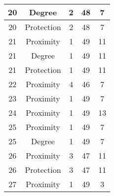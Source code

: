 \documentclass[results.tex]{subfiles}
\begin{document}
\begin{center}
\begin{tabular}{| c || c | c | c | c |}
            \hline
            20                      & Degree                       & 2                      & 48                      & 7                    \\
            \hline
            20                      & Protection                   & 2                      & 48                      & 7                    \\
            \hline
            21                      & Proximity                    & 1                      & 49                      & 11                   \\
            \hline
            21                      & Degree                       & 1                      & 49                      & 11                   \\
            \hline
            21                      & Protection                   & 1                      & 49                      & 11                   \\
            \hline
            22                      & Proximity                    & 4                      & 46                      & 7                    \\
            \hline
            23                      & Proximity                    & 1                      & 49                      & 7                    \\
            \hline
            24                      & Proximity                    & 1                      & 49                      & 13                   \\
            \hline
            25                      & Proximity                    & 1                      & 49                      & 7                    \\
            \hline
            25                      & Degree                       & 1                      & 49                      & 7                    \\
            \hline
            26                      & Proximity                    & 3                      & 47                      & 11                   \\
            \hline
            26                      & Protection                   & 3                      & 47                      & 11                   \\
            \hline
            27                      & Proximity                    & 1                      & 49                      & 3                    \\

\end{tabular}
\end{center}
\end{document}

